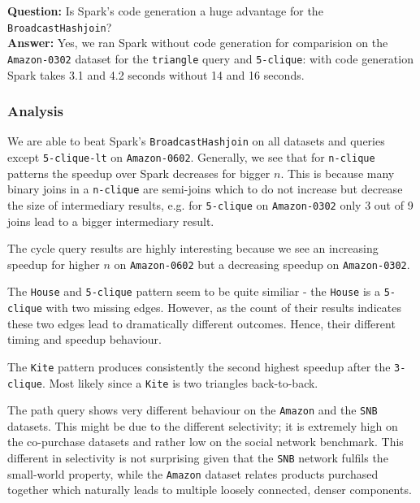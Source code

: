 \textbf{Question:} Is Spark's code generation a huge advantage for the \texttt{BroadcastHashjoin}?\\
\textbf{Answer:} Yes, we ran Spark without code generation for comparision on the \texttt{Amazon-0302} dataset for the \texttt{triangle}
query and \texttt{5-clique}: with code generation Spark takes 3.1 and 4.2 seconds without 14 and 16 seconds.

\subsubsection{Analysis}\label{sssec:seq-analysis}

We are able to beat Spark's \texttt{BroadcastHashjoin} on all datasets and queries except \texttt{5-clique-lt} on \texttt{Amazon-0602}.
Generally, we see that for \texttt{n-clique} patterns the speedup over Spark decreases for bigger $n$.
This is because many binary joins in a \texttt{n-clique} are semi-joins which to do not increase but decrease the size of intermediary results,
e.g. for \texttt{5-clique} on \texttt{Amazon-0302} only 3 out of 9 joins lead to a bigger intermediary result.

The cycle query results are highly interesting because we see an increasing speedup for higher $n$ on \texttt{Amazon-0602} but a
decreasing speedup on \texttt{Amazon-0302}.

The \texttt{House} and \texttt{5-clique} pattern seem to be quite similiar - the \texttt{House} is a \texttt{5-clique} with two missing
edges.
However, as the count of their results indicates these two edges lead to dramatically different outcomes.
Hence, their different timing and speedup behaviour.

The \texttt{Kite} pattern produces consistently the second highest speedup after the \texttt{3-clique}.
Most likely since a \texttt{Kite} is two triangles back-to-back.

The path query shows very different behaviour on the \texttt{Amazon} and the \texttt{SNB} datasets.
This might be due to the different selectivity; it is extremely high on the co-purchase datasets and rather low on the social network
benchmark.
This different in selectivity is not surprising given that the \texttt{SNB} network fulfils the small-world property, while the
\texttt{Amazon} dataset relates products purchased together which naturally leads to multiple loosely connected, denser components.


